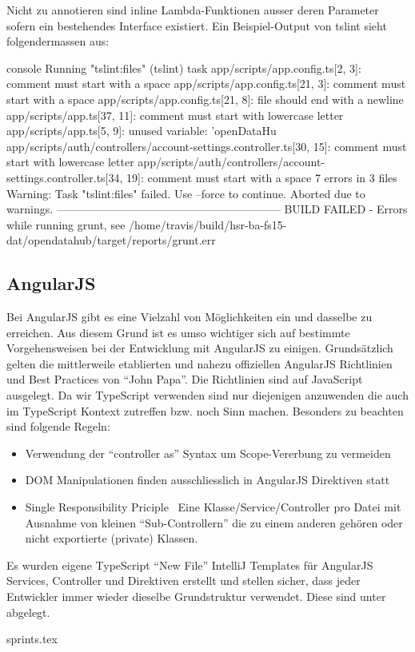 Nicht zu annotieren sind inline Lambda-Funktionen ausser deren Parameter sofern ein bestehendes Interface existiert. Ein Beispiel-Output von tslint sieht folgendermassen aus:

\begin{src}{console}
Running "tslint:files" (tslint) task
app/scripts/app.config.ts[2, 3]: comment must start with a space
app/scripts/app.config.ts[21, 3]: comment must start with a space
app/scripts/app.config.ts[21, 8]: file should end with a newline
app/scripts/app.ts[37, 11]: comment must start with lowercase letter
app/scripts/app.ts[5, 9]: unused variable: 'openDataHu
app/scripts/auth/controllers/account-settings.controller.ts[30, 15]: comment must start with lowercase letter
app/scripts/auth/controllers/account-settings.controller.ts[34, 19]: comment must start with a space
7 errors in 3 files
Warning: Task "tslint:files" failed. Use --force to continue.
Aborted due to warnings.
------------------------------------------------------------
BUILD FAILED - Errors while running grunt, see /home/travis/build/hsr-ba-fs15-dat/opendatahub/target/reports/grunt.err
\end{src}


\subsection{AngularJS}
Bei AngularJS gibt es eine Vielzahl von Möglichkeiten ein und dasselbe zu erreichen. Aus diesem Grund ist es umso wichtiger sich auf bestimmte Vorgehensweisen bei der Entwicklung mit AngularJS zu einigen. Grundsätzlich gelten die mittlerweile etablierten und nahezu offiziellen AngularJS Richtlinien und Best Practices von ``John Papa''\cite{angular-styleguide}. Die Richtlinien sind auf JavaScript ausgelegt. Da wir TypeScript verwenden sind nur diejenigen anzuwenden die auch im TypeScript Kontext zutreffen bzw. noch Sinn machen. Besonders zu beachten sind folgende Regeln:

\begin{itemize}
	\item Verwendung der ``controller as'' Syntax um Scope-Vererbung zu vermeiden
	\item DOM Manipulationen finden ausschliesslich in AngularJS Direktiven statt
	\item Single Responsibility Priciple \textendash\ Eine Klasse/Service/Controller pro Datei mit Ausnahme von kleinen ``Sub-Controllern'' die zu einem anderen gehören oder nicht exportierte (private) Klassen.
\end{itemize}

Es wurden eigene TypeScript ``New File'' IntelliJ Templates für AngularJS Services, Controller und Direktiven erstellt und stellen sicher, dass jeder Entwickler immer wieder dieselbe Grundstruktur verwendet. Diese sind unter  abgelegt.



{sprints.tex}


